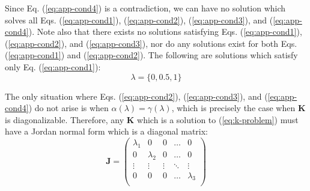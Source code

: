 \documentclass{article}
\theoremstyle{plain}
\theoremstyle{definition}
\theoremstyle{remark}
\newcommand{\vA}{\mathbf{A}}
\newcommand{\vJ}{\mathbf{J}}
\newcommand{\vK}{\mathbf{K}}
\begin{document}
Since Eq. (\ref{eq:app-cond4}) is a contradiction, we can have no solution which solves all Eqs. (\ref{eq:app-cond1}), (\ref{eq:app-cond2}), (\ref{eq:app-cond3}), and (\ref{eq:app-cond4}). Note also that there exists no solutions satisfying Eqs. (\ref{eq:app-cond1}), (\ref{eq:app-cond2}), and (\ref{eq:app-cond3}), nor do any solutions exist for both Eqs. (\ref{eq:app-cond1}) and (\ref{eq:app-cond2}). The following are solutions which satisfy only Eq. (\ref{eq:app-cond1}):
\begin{equation}
    \lambda =\{0, 0.5, 1\}
\end{equation}

The only situation where Eqs. (\ref{eq:app-cond2}), (\ref{eq:app-cond3}), and (\ref{eq:app-cond4}) do not arise is when ${\alpha(\lambda)=\gamma(\lambda)}$, which is precisely the case when $\vK$ is diagonalizable. Therefore, any $\vK$ which is a solution to (\ref{eq:k-problem}) must have a Jordan normal form which is a diagonal matrix:
\begin{equation}
    \vJ = \begin{pmatrix}
        \lambda_1 & 0         & 0      & \hdots & 0         \\
        0         & \lambda_2 & 0      & \hdots & 0         \\
        \vdots    & \vdots    & \vdots & \ddots & \vdots    \\
        0         & 0         & 0      & \hdots & \lambda_3 \\
    \end{pmatrix}
\end{equation}

\end{document}
